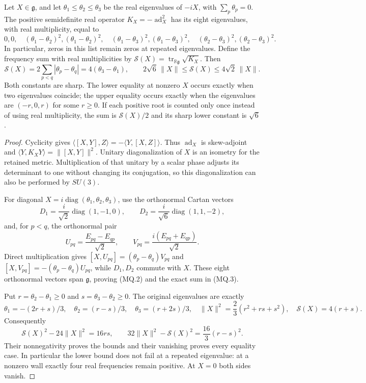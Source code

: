 \begin{lemma}
\label{qh:matrix-root-sum}
Let $X\in\mathfrak g$, and let $\theta_1\leq\theta_2\leq\theta_3$
be the real eigenvalues of $-iX$, with $\sum_p\theta_p=0$.
The positive semidefinite real operator
$K_X=-\operatorname{ad}_X^2$ has its eight eigenvalues, with real
multiplicity, equal to
\[
 0,0,\quad
 (\theta_1-\theta_2)^2,(\theta_1-\theta_2)^2,\quad
 (\theta_1-\theta_3)^2,(\theta_1-\theta_3)^2,\quad
 (\theta_2-\theta_3)^2,(\theta_2-\theta_3)^2.                  \tag{MQ.2}
\]
In particular, zeros in this list remain zeros at repeated eigenvalues.
Define the frequency sum with real multiplicities by
$\mathcal S(X)=\operatorname{tr}_{\mathbb R\mathfrak g}\sqrt{K_X}$.
Then
\[
 \mathcal S(X)
 =2\sum_{p<q}|\theta_p-\theta_q|
 =4(\theta_3-\theta_1),\qquad
 2\sqrt6\,\|X\|\leq\mathcal S(X)\leq4\sqrt2\,\|X\|.           \tag{MQ.3}
\]
Both constants are sharp. The lower equality at nonzero $X$ occurs
exactly when two eigenvalues coincide; the upper equality occurs exactly
when the eigenvalues are $(-r,0,r)$ for some $r\geq0$.
If each positive root is counted only once instead of using real
multiplicity, the sum is $\mathcal S(X)/2$ and its sharp lower
constant is $\sqrt6$.
\end{lemma}
\begin{proof}
Cyclicity gives
$\langle[X,Y],Z\rangle=-\langle Y,[X,Z]\rangle$.
Thus $\operatorname{ad}_X$ is skew-adjoint and
$\langle Y,K_XY\rangle=\|[X,Y]\|^2$.
Unitary diagonalization of $X$ is an isometry for the retained metric.
Multiplication of that unitary by a scalar phase adjusts its determinant
to one without changing its conjugation, so this diagonalization can
also be performed by $SU(3)$.

For diagonal $X=i\operatorname{diag}(\theta_1,\theta_2,\theta_3)$,
use the orthonormal Cartan vectors
\[
 D_1=\frac{i}{\sqrt2}\operatorname{diag}(1,-1,0),\qquad
 D_2=\frac{i}{\sqrt6}\operatorname{diag}(1,1,-2),
\]
and, for $p<q$, the orthonormal pair
\[
 U_{pq}=\frac{E_{pq}-E_{qp}}{\sqrt2},\qquad
 V_{pq}=\frac{i(E_{pq}+E_{qp})}{\sqrt2}.
\]
Direct multiplication gives
$[X,U_{pq}]=(\theta_p-\theta_q)V_{pq}$ and
$[X,V_{pq}]=-(\theta_p-\theta_q)U_{pq}$, while $D_1,D_2$
commute with $X$. These eight orthonormal vectors span $\mathfrak g$,
proving (MQ.2) and the exact sum in (MQ.3).

Put $r=\theta_2-\theta_1\geq0$ and $s=\theta_3-\theta_2\geq0$.
The original eigenvalues are exactly
\[
 \theta_1=-(2r+s)/3,\quad \theta_2=(r-s)/3,\quad
 \theta_3=(r+2s)/3,\quad
 \|X\|^2=\frac23(r^2+rs+s^2),\quad \mathcal S(X)=4(r+s).
\]
Consequently
\[
 \mathcal S(X)^2-24\|X\|^2=16rs,\qquad
 32\|X\|^2-\mathcal S(X)^2=\frac{16}{3}(r-s)^2.
\]
Their nonnegativity proves the bounds and their vanishing proves every
equality case. In particular the lower bound does not fail at a repeated
eigenvalue: at a nonzero wall exactly four real frequencies remain
positive. At $X=0$ both sides vanish.
\end{proof}

